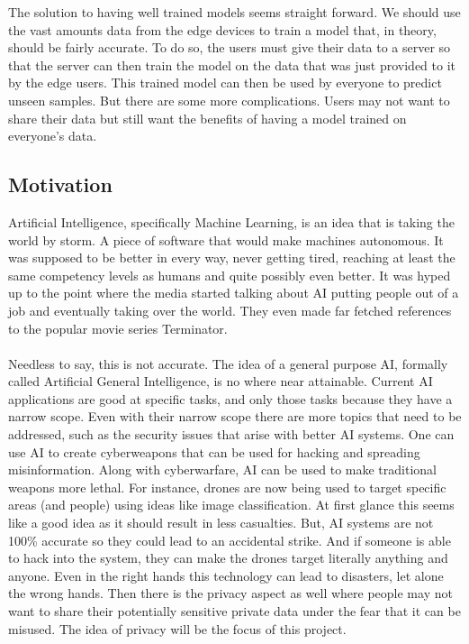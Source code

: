 \documentclass[12pt]{article}
\begin{document}
\noindent The solution to having well trained models seems straight forward. We should use the vast amounts data from the edge devices to train a model that, in theory, should be fairly accurate. To do so, the users must give their data to a server so that the server can then train the model on the data that was just provided to it by the edge users. This trained model can then be used by everyone to predict unseen samples. But there are some more complications. Users may not want to share their data but still want the benefits of having a model trained on everyone's data. 
\subsection{Motivation}
Artificial Intelligence, specifically Machine Learning, is an idea that is taking the world by storm. A piece of software that would make machines autonomous. It was supposed to be better in every way, never getting tired, reaching at least the same competency levels as humans and quite possibly even better. It was hyped up to the point where the media started talking about AI putting people out of a job and eventually taking over the world. They even made far fetched references to the popular movie series Terminator.
\\\\
Needless to say, this is not accurate. The idea of a general purpose AI, formally called Artificial General Intelligence, is no where near attainable. Current AI applications are good at specific tasks, and only those tasks because they have a narrow scope. Even with their narrow scope there are more topics that need to be addressed, such as the security issues that arise with better AI systems. One can use AI to create cyberweapons that can be used for hacking and spreading misinformation. Along with cyberwarfare, AI can be used to make traditional weapons more lethal. For instance, drones are now being used to target specific areas (and people) using ideas like image classification. At first glance this seems like a good idea as it should result in less casualties. But, AI systems are not 100\% accurate so they could lead to an accidental strike. And if someone is able to hack into the system, they can make the drones target literally anything and anyone. Even in the right hands this technology can lead to disasters, let alone the wrong hands. Then there is the privacy aspect as well where people may not want to share their potentially sensitive private data under the fear that it can be misused. The idea of privacy will be the focus of this project.
\end{document}
